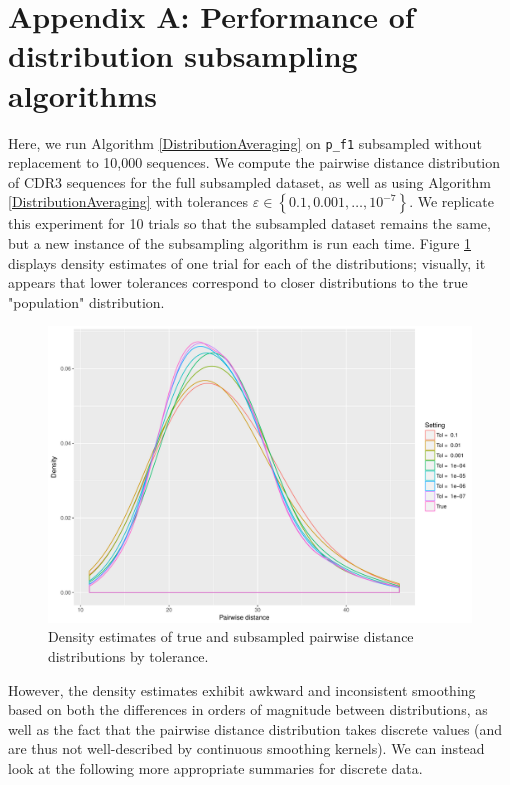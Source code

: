 \documentclass{article}
\begin{document}



\section*{Appendix A: Performance of distribution subsampling algorithms}
Here, we run Algorithm \ref{DistributionAveraging} on \texttt{p\_f1} subsampled without replacement to 10,000 sequences.
We compute the pairwise distance distribution of CDR3 sequences for the full subsampled dataset, as well as using Algorithm \ref{DistributionAveraging} with tolerances $\varepsilon \in \left\{0.1, 0.001, \dotsc, 10^{-7} \right\}$.
We replicate this experiment for 10 trials so that the subsampled dataset remains the same, but a new instance of the subsampling algorithm is run each time.
Figure \ref{fig:Distributions} displays density estimates of one trial for each of the distributions; visually, it appears that lower tolerances correspond to closer distributions to the true "population" distribution.
\begin{figure}
    \includegraphics[width=\linewidth]{Figures/PairwiseDistance/density_by_tol.pdf}
    \caption{Density estimates of true and subsampled pairwise distance distributions by tolerance.}
    \label{fig:Distributions}
\end{figure}
However, the density estimates exhibit awkward and inconsistent smoothing based on both the differences in orders of magnitude between distributions, as well as the fact that the pairwise distance distribution takes discrete values (and are thus not well-described by continuous smoothing kernels).
We can instead look at the following more appropriate summaries for discrete data.
\end{document}
